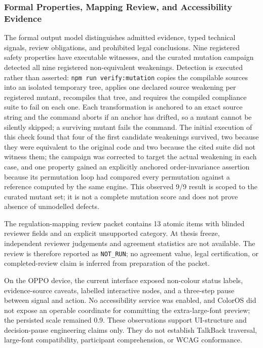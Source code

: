 \subsubsection{Formal Properties, Mapping Review, and Accessibility Evidence}

The formal output model distinguishes admitted evidence, typed technical signals, review obligations, and prohibited legal conclusions. Nine registered safety properties have executable witnesses, and the curated mutation campaign detected all nine registered non-equivalent weakenings. Detection is executed rather than asserted: \texttt{npm run verify:mutation} copies the compilable sources into an isolated temporary tree, applies one declared source weakening per registered mutant, recompiles that tree, and requires the compiled compliance suite to fail on each one. Each transformation is anchored to an exact source string and the command aborts if an anchor has drifted, so a mutant cannot be silently skipped; a surviving mutant fails the command. The initial execution of this check found that four of the first candidate weakenings survived, two because they were equivalent to the original code and two because the cited suite did not witness them; the campaign was corrected to target the actual weakening in each case, and one property gained an explicitly anchored order-invariance assertion because its permutation loop had compared every permutation against a reference computed by the same engine. This observed 9/9 result is scoped to the curated mutant set; it is not a complete mutation score and does not prove absence of unmodelled defects.

The regulation-mapping review packet contains 13 atomic items with blinded reviewer fields and an explicit unsupported category. At thesis freeze, independent reviewer judgements and agreement statistics are not available. The review is therefore reported as \texttt{NOT\_RUN}; no agreement value, legal certification, or completed-review claim is inferred from preparation of the packet.

On the OPPO device, the current interface exposed non-colour status labels, evidence-source caveats, labelled interactive nodes, and a three-step pause between signal and action. No accessibility service was enabled, and ColorOS did not expose an operable coordinate for committing the extra-large-font preview; the persisted scale remained 0.9. These observations support UI-structure and decision-pause engineering claims only. They do not establish TalkBack traversal, large-font compatibility, participant comprehension, or WCAG conformance.

